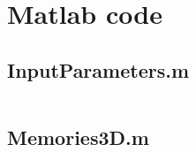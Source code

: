 \chapter{Matlab code}

\section{InputParameters.m}
\inputminted[linenos=true, 
bgcolor=bgcode,
frame=lines,
framesep=2mm,
baselinestretch=1.2,
fontsize=\footnotesize,
breaklines,
]{matlab}{Code/InputParameters.m}

\section{Memories3D.m}
\inputminted[linenos=true, 
bgcolor=bgcode,
frame=lines,
framesep=2mm,
baselinestretch=1.2,
fontsize=\footnotesize,
breaklines,
]{matlab}{Code/Memories3D.m}